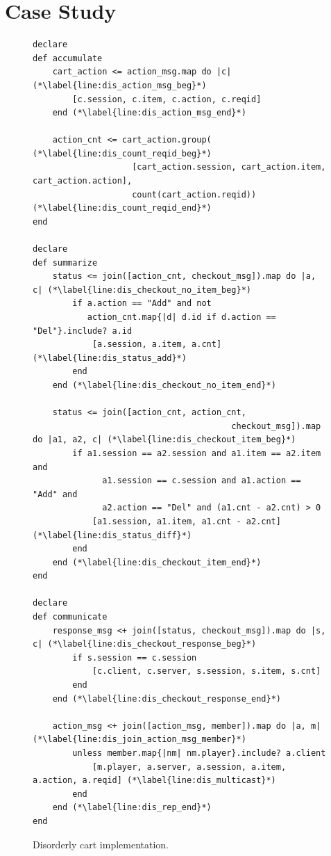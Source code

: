 \section{Case Study}
\label{sec:case}

\begin{figure}[t]
\begin{scriptsize}
\begin{lstlisting}
declare
def accumulate
	cart_action <= action_msg.map do |c| (*\label{line:dis_action_msg_beg}*)
		[c.session, c.item, c.action, c.reqid]
	end (*\label{line:dis_action_msg_end}*)

	action_cnt <= cart_action.group( (*\label{line:dis_count_reqid_beg}*)
					[cart_action.session, cart_action.item, cart_action.action],
					count(cart_action.reqid)) (*\label{line:dis_count_reqid_end}*)
end

declare
def summarize
	status <= join([action_cnt, checkout_msg]).map do |a, c| (*\label{line:dis_checkout_no_item_beg}*)
		if a.action == "Add" and not
		   action_cnt.map{|d| d.id if d.action == "Del"}.include? a.id 
			[a.session, a.item, a.cnt] (*\label{line:dis_status_add}*)
		end 
	end (*\label{line:dis_checkout_no_item_end}*)

	status <= join([action_cnt, action_cnt,
										checkout_msg]).map do |a1, a2, c| (*\label{line:dis_checkout_item_beg}*)
		if a1.session == a2.session and a1.item == a2.item and
			  a1.session == c.session and a1.action == "Add" and
			  a2.action == "Del" and (a1.cnt - a2.cnt) > 0
			[a1.session, a1.item, a1.cnt - a2.cnt] (*\label{line:dis_status_diff}*)
		end
	end (*\label{line:dis_checkout_item_end}*)
end

declare 
def communicate
	response_msg <+ join([status, checkout_msg]).map do |s, c| (*\label{line:dis_checkout_response_beg}*)
		if s.session == c.session
			[c.client, c.server, s.session, s.item, s.cnt]
		end
	end (*\label{line:dis_checkout_response_end}*)

	action_msg <+ join([action_msg, member]).map do |a, m| (*\label{line:dis_join_action_msg_member}*)
		unless member.map{|nm| nm.player}.include? a.client
			[m.player, a.server, a.session, a.item, a.action, a.reqid] (*\label{line:dis_multicast}*)
		end 
	end (*\label{line:dis_rep_end}*)
end
\end{lstlisting}
\vspace{-10pt}
\caption{Disorderly cart implementation.}
\label{fig:pdg-disorderly}
\end{scriptsize}
\vspace{-2pt}
\end{figure}

